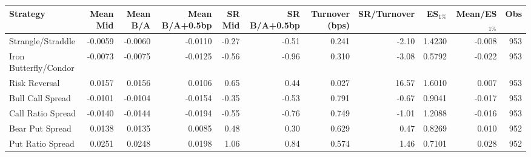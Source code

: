 \begin{tabular}{lrrrrrrrrrr}
\toprule
Strategy & Mean Mid & Mean B/A & Mean B/A+0.5bp & SR Mid & SR B/A+0.5bp & Turnover (bps) & SR/Turnover & ES$_{1\%}$ & Mean/ES$_{1\%}$ & Obs \\
\midrule
Strangle/Straddle & -0.0059 & -0.0060 & -0.0110 & -0.27 & -0.51 & 0.241 & -2.10 & 1.4230 & -0.008 & 953 \\
Iron Butterfly/Condor & -0.0073 & -0.0075 & -0.0125 & -0.56 & -0.96 & 0.310 & -3.08 & 0.5792 & -0.022 & 953 \\
Risk Reversal & 0.0157 & 0.0156 & 0.0106 & 0.65 & 0.44 & 0.027 & 16.57 & 1.6010 & 0.007 & 953 \\
Bull Call Spread & -0.0101 & -0.0104 & -0.0154 & -0.35 & -0.53 & 0.791 & -0.67 & 0.9041 & -0.017 & 953 \\
Call Ratio Spread & -0.0140 & -0.0144 & -0.0194 & -0.55 & -0.76 & 0.749 & -1.01 & 1.2088 & -0.016 & 953 \\
Bear Put Spread & 0.0138 & 0.0135 & 0.0085 & 0.48 & 0.30 & 0.629 & 0.47 & 0.8269 & 0.010 & 952 \\
Put Ratio Spread & 0.0251 & 0.0248 & 0.0198 & 1.06 & 0.84 & 0.574 & 1.46 & 0.7101 & 0.028 & 952 \\
\bottomrule
\end{tabular}
